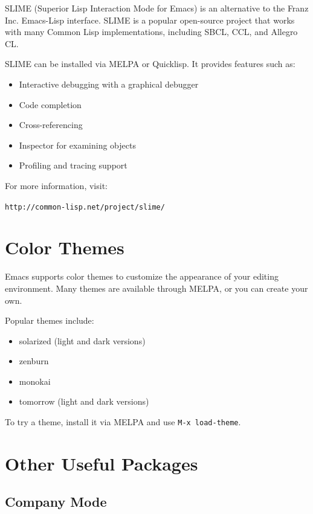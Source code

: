SLIME (Superior Lisp Interaction Mode for Emacs) is an alternative to the Franz Inc.
Emacs-Lisp interface. SLIME is a popular open-source project that works with many Common Lisp implementations, including SBCL, CCL, and Allegro CL.

SLIME can be installed via MELPA or Quicklisp. It provides features such as:

\begin{itemize}
\item Interactive debugging with a graphical debugger
\item Code completion
\item Cross-referencing
\item Inspector for examining objects
\item Profiling and tracing support
\end{itemize}

For more information, visit:

\begin{center}
\texttt{http://common-lisp.net/project/slime/}
\end{center}

\section{Color Themes}

Emacs supports color themes to customize the appearance of your editing environment. Many
themes are available through MELPA, or you can create your own.

Popular themes include:

\begin{itemize}
\item solarized (light and dark versions)
\item zenburn
\item monokai
\item tomorrow (light and dark versions)
\end{itemize}

To try a theme, install it via MELPA and use \texttt{M-x load-theme}.

\section{Other Useful Packages}

\subsection{Company Mode}

